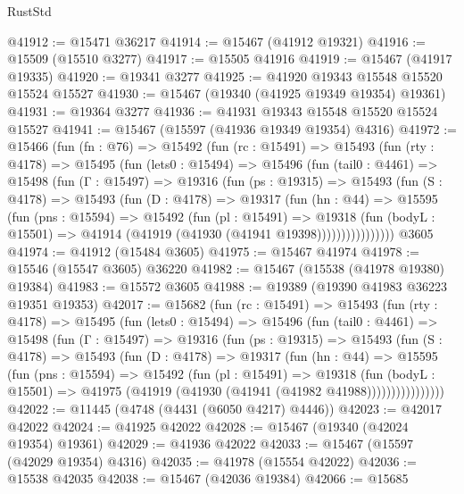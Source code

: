 \begin{lexlean}{RustStd}
\begin{coremodule}
@41912 := @15471 @36217
@41914 := @15467 (@41912 @19321)
@41916 := @15509 (@15510 @3277)
@41917 := @15505 @41916
@41919 := @15467 (@41917 @19335)
@41920 := @19341 @3277
@41925 := @41920 @19343 @15548 @15520 @15524 @15527
@41930 := @15467 (@19340 (@41925 @19349 @19354) @19361)
@41931 := @19364 @3277
@41936 := @41931 @19343 @15548 @15520 @15524 @15527
@41941 := @15467 (@15597 (@41936 @19349 @19354) @4316)
@41972 := @15466
    (fun (fn : @76) =>
    @15492
      (fun (rc : @15491) =>
      @15493
        (fun (rty : @4178) =>
        @15495
          (fun (lets0 : @15494) =>
          @15496
            (fun (tail0 : @4461) =>
            @15498
              (fun (Γ : @15497) =>
              @19316
                (fun (ps : @19315) =>
                @15493
                  (fun (S : @4178) =>
                  @15493
                    (fun (D : @4178) =>
                    @19317
                      (fun (hn : @44) =>
                      @15595
                        (fun (pns : @15594) =>
                        @15492
                          (fun (pl : @15491) =>
                          @19318
                            (fun (bodyL : @15501) =>
                            @41914 (@41919 (@41930 (@41941 @19398))))))))))))))))
    @3605
@41974 := @41912 (@15484 @3605)
@41975 := @15467 @41974
@41978 := @15546 (@15547 @3605) @36220
@41982 := @15467 (@15538 (@41978 @19380) @19384)
@41983 := @15572 @3605
@41988 := @19389 (@19390 @41983 @36223 @19351 @19353)
@42017 := @15682
    (fun (rc : @15491) =>
    @15493
      (fun (rty : @4178) =>
      @15495
        (fun (lets0 : @15494) =>
        @15496
          (fun (tail0 : @4461) =>
          @15498
            (fun (Γ : @15497) =>
            @19316
              (fun (ps : @19315) =>
              @15493
                (fun (S : @4178) =>
                @15493
                  (fun (D : @4178) =>
                  @19317
                    (fun (hn : @44) =>
                    @15595
                      (fun (pns : @15594) =>
                      @15492
                        (fun (pl : @15491) =>
                        @19318
                          (fun (bodyL : @15501) =>
                          @41975 (@41919 (@41930 (@41941 (@41982 @41988))))))))))))))))
@42022 := @11445 (@4748 (@4431 (@6050 @4217) @4446))
@42023 := @42017 @42022
@42024 := @41925 @42022
@42028 := @15467 (@19340 (@42024 @19354) @19361)
@42029 := @41936 @42022
@42033 := @15467 (@15597 (@42029 @19354) @4316)
@42035 := @41978 (@15554 @42022)
@42036 := @15538 @42035
@42038 := @15467 (@42036 @19384)
@42066 := @15685

\end{coremodule}
\end{lexlean}
